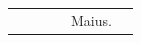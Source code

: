 \documentclass[openany]{book}
\renewcommand{\\}{\par\hspace*{.1em}} %
\begin{document}
\begin{center}
\begin{tabular}{l | l | l | r | l l}
& & & & \color{Red} Maius. \\

\end{tabular}
\end{center}
\end{document}
